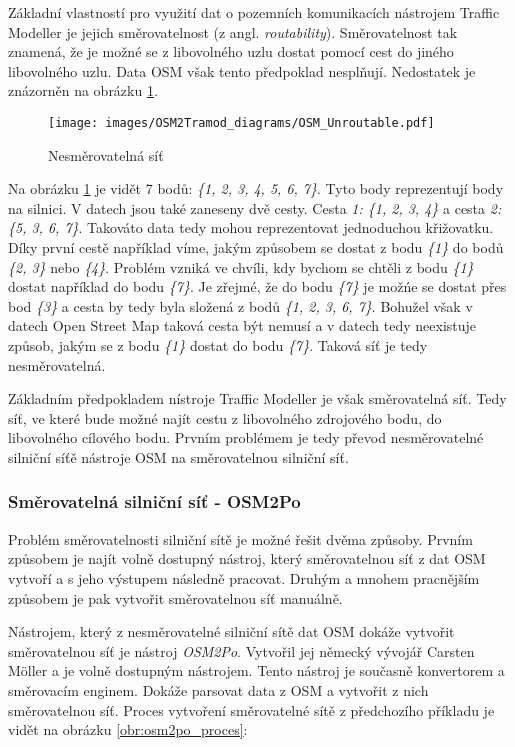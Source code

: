 Základní vlastností pro využití dat o pozemních komunikacích nástrojem Traffic Modeller je jejich směrovatelnost (z angl. \textit{routability}). Směrovatelnost tak znamená, že je možné se z libovolného uzlu dostat pomocí cest do jiného libovolného uzlu. Data OSM však tento předpoklad nesplňují. Nedostatek je znázorněn na obrázku \ref{obr:nesmerovatelna_sit}.

\begin{figure}[htbp]
\centering
\texttt{[image: images/OSM2Tramod\_diagrams/OSM\_Unroutable.pdf]}
\caption{Nesměrovatelná síť}
\label{obr:nesmerovatelna_sit}
\end{figure}

Na obrázku \ref{obr:nesmerovatelna_sit} je vidět 7 bodů: \textit{\{1, 2, 3, 4, 5, 6, 7\}}. Tyto body reprezentují body na silnici. V datech jsou také zaneseny dvě cesty. Cesta \textit{1: \{1, 2, 3, 4\}} a cesta \textit{2: \{5, 3, 6, 7\}}. Takováto data tedy mohou reprezentovat jednoduchou křižovatku. Díky první cestě například víme, jakým způsobem se dostat z bodu \textit{\{1\}} do bodů \textit{\{2, 3\}} nebo \textit{\{4\}}. Problém vzniká ve chvíli, kdy bychom se chtěli z bodu \textit{\{1\}} dostat například do bodu \textit{\{7\}}. Je zřejmé, že do bodu \textit{\{7\}} je možńe se dostat přes bod \textit{\{3\}} a cesta by tedy byla složená z bodů \textit{\{1, 2, 3, 6, 7\}}. Bohužel však v datech Open Street Map taková cesta být nemusí a v datech tedy neexistuje způsob, jakým se z bodu \textit{\{1\}} dostat do bodu \textit{\{7\}}. Taková síť je tedy nesměrovatelná.

Základním předpokladem nístroje Traffic Modeller je však směrovatelná síť. Tedy síť, ve které bude možné najít cestu z libovolného zdrojového bodu, do libovolného cílového bodu. Prvním problémem je tedy převod nesměrovatelné silniční síťě nástroje OSM na směrovatelnou silniční síť.  

\subsubsection{Směrovatelná silniční síť - OSM2Po}

Problém směrovatelnosti silniční sítě je možné řešit dvěma způsoby. Prvním způsobem je najít volně dostupný nástroj, který směrovatelnou síť z dat OSM vytvoří a s jeho výstupem následně pracovat. Druhým a mnohem pracnějším způsobem je pak vytvořit směrovatelnou síť manuálně. 

Nástrojem, který z nesměrovatelné silniční sítě dat OSM dokáže vytvořit směrovatelnou síť je nástroj \textit{OSM2Po}. Vytvořil jej německý vývojář Carsten Möller a je volně dostupným nástrojem. Tento nástroj je současně konvertorem a směrovacím enginem. Dokáže parsovat data z OSM a vytvořit z nich směrovatelnou síť. Proces vytvoření směrovatelné sítě z předchozího příkladu je vidět na obrázku \ref{obr:osm2po_proces}: 

